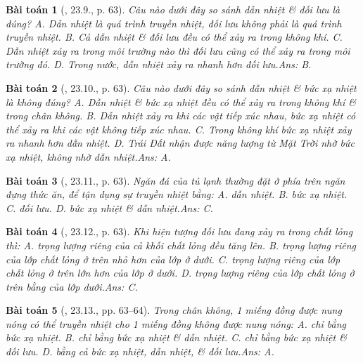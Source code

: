 \documentclass{article}
\newtheorem{baitoan}{Bài toán}
\begin{document}
\begin{baitoan}[\cite{SBT_Vat_Ly_8}, 23.9., p. 63]
	Câu nào dưới đây so sánh dẫn nhiệt \& đối lưu là đúng? {\sf A.} Dẫn nhiệt là quá trình truyền nhiệt, đối lưu không phải là quá trình truyền nhiệt. {\sf B.} Cả dẫn nhiệt \& đối lưu đều có thể xảy ra trong không khí. {\sf C.} Dẫn nhiệt xảy ra trong môi trường nào thì đối lưu cũng có thể xảy ra trong môi trường đó. {\sf D.} Trong nước, dẫn nhiệt xảy ra nhanh hơn đối lưu.\hfill{\sf Ans: B.}
\end{baitoan}

\begin{baitoan}[\cite{SBT_Vat_Ly_8}, 23.10., p. 63]
	Câu nào dưới đây so sánh dẫn nhiệt \& bức xạ nhiệt là không đúng? {\sf A.} Dẫn nhiệt \& bức xạ nhiệt đều có thể xảy ra trong không khí \& trong chân không. {\sf B.} Dẫn nhiệt xảy ra khi các vật tiếp xúc nhau, bức xạ nhiệt có thể xảy ra khi các vật không tiếp xúc nhau. {\sf C.} Trong không khí bức xạ nhiệt xảy ra nhanh hơn dẫn nhiệt. {\sf D.} Trái Đất nhận được năng lượng từ Mặt Trời nhờ bức xạ nhiệt, không nhờ dẫn nhiệt.\hfill{\sf Ans: A.}
\end{baitoan}

\begin{baitoan}[\cite{SBT_Vat_Ly_8}, 23.11., p. 63]
	Ngăn đá của tủ lạnh thường đặt ở phía trên ngăn đựng thức ăn, để tận dụng sự truyền nhiệt bằng: {\sf A.} dẫn nhiệt. {\sf B.} bức xạ nhiệt. {\sf C.} đối lưu. {\sf D.} bức xạ nhiệt \& dẫn nhiệt.\hfill{\sf Ans: C.}
\end{baitoan}

\begin{baitoan}[\cite{SBT_Vat_Ly_8}, 23.12., p. 63]
	Khi hiện tượng đối lưu đang xảy ra trong chất lỏng thì: {\sf A.} trọng lượng riêng của cả khối chất lỏng đều tăng lên. {\sf B.} trọng lượng riêng của lớp chất lỏng ở trên nhỏ hơn của lớp ở dưới. {\sf C.} trọng lượng riêng của lớp chất lỏng ở trên lớn hơn của lớp ở dưới. {\sf D.} trọng lượng riêng của lớp chất lỏng ở trên bằng của lớp dưới.\hfill{\sf Ans: C.}
\end{baitoan}

\begin{baitoan}[\cite{SBT_Vat_Ly_8}, 23.13., pp. 63--64]
	Trong chân không, 1 miếng đồng được nung nóng có thể truyền nhiệt cho 1 miếng đồng không được nung nóng: {\sf A.} chỉ bằng bức xạ nhiệt. {\sf B.} chỉ bằng bức xạ nhiệt \& dẫn nhiệt. {\sf C.} chỉ bằng bức xạ nhiệt \& đối lưu. {\sf D.} bằng cả bức xạ nhiệt, dẫn nhiệt, \& đối lưu.\hfill{\sf Ans: A.}
\end{baitoan}
\end{document}
